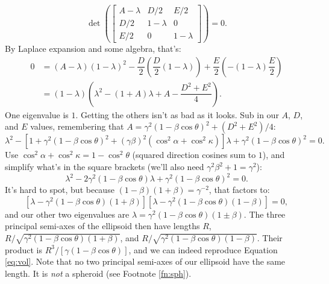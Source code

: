 \documentclass[12pt]{article}
\begin{document}
\begin{equation*}
\det
\left(
\begin{bmatrix}
A - \lambda & D/2 & E/2 \\
D/2 & 1 - \lambda & 0 \\
E/2 & 0 & 1 - \lambda
\end{bmatrix}
\right)
= 0 .
\end{equation*}
By Laplace expansion and some algebra, that's:
\begin{equation*}
\begin{aligned}
0 &= \left( A - \lambda \right) \left( 1 - \lambda \right)^2 - \dfrac{D}{2} \left( \dfrac{D}{2} \left(1 - \lambda \right) \right) + \dfrac{E}{2} \left( - \left(1 - \lambda \right) \dfrac{E}{2} \right) \\[5pt]
&= \left(1 - \lambda \right) \left( \lambda^2 - \left( 1 + A \right)\lambda + A - \dfrac{D^2 + E^2}{4} \right).
\end{aligned}
\end{equation*}
One eigenvalue is $1$. Getting the others isn't as bad as it looks. Sub in our $A$, $D$, and $E$ values, remembering that $A = \gamma^2 (1 - \beta \cos \theta)^2 + (D^2 + E^2)/4$:
\begin{equation*}
\lambda^2 - \left[ 1 + \gamma^2 (1 - \beta \cos \theta)^2 + (\gamma \beta)^2 ( \cos^2 \alpha + \cos^2 \kappa ) \right] \lambda + \gamma^2 (1 - \beta \cos \theta)^2 = 0.
\end{equation*}
Use $\cos^2 \alpha + \cos^2 \kappa = 1 - \cos^2 \theta$ (squared direction cosines sum to $1$), and simplify what's in the square brackets (we'll also need $\gamma^2 \beta^2 + 1 = \gamma^2$):
\begin{equation*}
\lambda^2 - 2 \gamma^2 ( 1 - \beta \cos \theta ) \lambda + \gamma^2 (1 - \beta \cos \theta)^2 = 0.
\end{equation*}
It's hard to spot, but because $(1 - \beta)(1 + \beta) = \gamma^{-2}$, that factors to:
\begin{equation*}
\left[ \lambda - \gamma^2 (1 - \beta \cos \theta) (1 + \beta) \right] \left[ \lambda - \gamma^2 (1 - \beta \cos \theta) (1 - \beta) \right] = 0,
\end{equation*}
and our other two eigenvalues are $\lambda = \gamma^2 (1 - \beta \cos \theta)(1 \pm \beta)$. The three principal semi-axes of the ellipsoid then have lengths $R$, $R /  \sqrt{\gamma^2 (1 - \beta \cos \theta)(1 + \beta)}$, and $R / \sqrt{\gamma^2 (1 - \beta \cos \theta)(1 - \beta)}$. Their product is $R^3 / [\gamma(1 - \beta \cos \theta)]$, and we can indeed reproduce Equation \ref{eq:vol}. Note that no two principal semi-axes of our ellipsoid have the same length. It is \emph{not} a spheroid (see Footnote \ref{fn:sph}).
\end{document}
